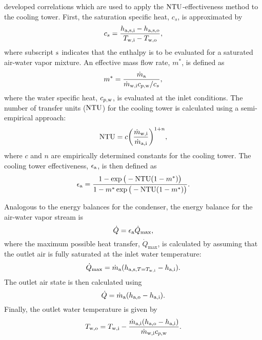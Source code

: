\textcite{braun1989} developed correlations which are used to apply
the $\mathrm{NTU}$-effectiveness method to the cooling tower. First, the
saturation specific heat, $c_s$, is approximated by
\begin{equation}
  c_s = \frac{h_{\text{a},\text{s},\text{i}}-h_{\text{a},\text{s},\text{o}}}{T_{\text{w},\text{i}} - T_{\text{w},\text{o}}},
\end{equation}
where subscript $\text{s}$ indicates that the enthalpy is to be evaluated 
for a saturated air-water vapor mixture.
An effective mass flow rate, $m^*$, is defined as
\begin{equation}
  m^* = \frac{\dot{m}_{\text{a}}}{\dot{m}_{\text{w},\text{i}} c_{p,\text{w}}/c_s},
\end{equation}
where the water specific heat, $c_{p,\text{w}}$, is evaluated at the inlet conditions.
The number of transfer units ($\mathrm{NTU}$) for the cooling tower is calculated using
a semi-empirical approach:
\begin{equation}
  \mathrm{NTU} = c \bigg( \frac{\dot{m}_{\text{w},\text{i}}}{\dot{m}_{\text{a},\text{i}}} \bigg)^{1+n},
\end{equation}
where $c$ and $n$ are empirically determined constants for the cooling tower.
The cooling tower effectiveness, $\epsilon_{\text{a}}$, is then defined as
\begin{equation}
  \epsilon_{\text{a}} = \frac{1-\exp{\big(-\mathrm{NTU}(1-m^*)\big)}}{1-m^*\exp{\big(-\mathrm{NTU}(1-m^*)\big)}}.
\end{equation}

Analogous to the energy balances for the condenser, the energy balance for the
air-water vapor stream is
\begin{equation}
  \dot{Q} = \epsilon_{\text{a}} \dot{Q}_{\max},
\end{equation}
where the maximum possible heat transfer, $\dot{Q}_{\max}$, is calculated 
by assuming that the outlet air is fully saturated at the inlet water temperature:
\begin{equation}
  \dot{Q}_{\max} = \dot{m}_{\text{a}} (h_{\text{a},\text{s},T=T_{\text{w},\text{i}}} - h_{\text{a},\text{i}}).
\end{equation}
The outlet air state is then calculated using
\begin{equation}
  \dot{Q} = \dot{m}_{\text{a}} (h_{\text{a},\text{o}} - h_{\text{a},\text{i}}).
\end{equation}
Finally, the outlet water temperature is given by
\begin{equation}
  T_{\text{w},\text{o}} = T_{\text{w},\text{i}} - \frac{\dot{m}_{\text{a},\text{i}}(h_{\text{a},\text{o}} - h_{\text{a},\text{i}})}{\dot{m}_{\text{w},\text{i}} c_{p,\text{w}}}.
\end{equation}


